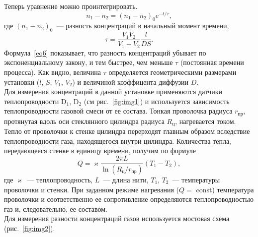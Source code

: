 \documentclass[a4paper,11pt]{article}
\begin{document}
Теперь уравнение можно проинтегрировать.
\begin{equation}\label{eq6}
  n_{1} - n_{2} = \left(n_{1} - n_{2}\right)_{0} e^{-t/\tau},
\end{equation}
где $\left(n_{1} - n_{2}\right)_{0}$~--- разность концентраций в начальный момент времени,
\begin{equation}\label{eq7}
  \tau = \frac{V_{1}V_{2}}{V_{1}+V_{2}}\frac{l}{DS}.
\end{equation}
Формула~\ref{eq6} показывает, что разность концентраций убывает по экспоненциальному закону, и тем быстрее, чем меньше $\tau$ (постоянная времени процесса). Как видно, величина $\tau$ определяется геометрическими размерами установки ($l$, $S$, $V_{1}$, $V_{2}$) и величиной коэффицента диффузии $D$.\\
Для измерения концентраций в данной установке применяются датчики теплопроводности D$_{1}$, D$_{2}$ (см рис.~\ref{fig:img1}) и используется зависимость теплопроводности газовой смеси от ее состава. Тонкая проволочка радиуса $r_{пр}$, протянутая вдоль оси стеклянного цилиндра радиуса $R_{ц}$, нагревается током. Тепло от проволочки к стенке цилиндра перерходят главным образом вследствие теплопроводности газа, находящегося внутри цилиндра. Количества тепла, передающееся стенке в единицу времени, получим по формуле
\begin{equation}\label{eq8}
  Q = \varkappa \frac{2\pi L}{\ln (R_{ц}/r_{пр})}(T_{1} - T_{2}),
\end{equation}
где $\varkappa$~--- теплопроводность, $L$~--- длина нити, $T_{1}$, $T_{2}$~--- температуры проволочки и стенки. При заданном режиме нагревания ($Q =$ const) температура проволочки и соответственно ее сопротивление определяются теплопроводностью газ и, следовательно, ее составом.\\
Для измерения разности концентраций газов используется мостовая схема (рис.~\ref{fig:img2}).\\
\end{document}

